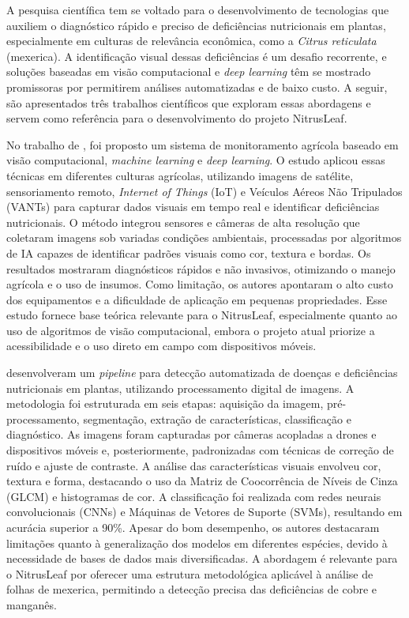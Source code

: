A pesquisa científica tem se voltado para o desenvolvimento de tecnologias que auxiliem o diagnóstico rápido e preciso de deficiências nutricionais em plantas, especialmente em culturas de relevância econômica, como a \textit{Citrus reticulata} (mexerica). A identificação visual dessas deficiências é um desafio recorrente, e soluções baseadas em visão computacional e \textit{deep learning} têm se mostrado promissoras por permitirem análises automatizadas e de baixo custo. A seguir, são apresentados três trabalhos científicos que exploram essas abordagens e servem como referência para o desenvolvimento do projeto NitrusLeaf.

No trabalho de \textcite{Muthusamy2023}, foi proposto um sistema de monitoramento agrícola baseado em visão computacional, \textit{machine learning} e \textit{deep learning}. O estudo aplicou essas técnicas em diferentes culturas agrícolas, utilizando imagens de satélite, sensoriamento remoto, \textit{Internet of Things} (IoT) e Veículos Aéreos Não Tripulados (VANTs) para capturar dados visuais em tempo real e identificar deficiências nutricionais. O método integrou sensores e câmeras de alta resolução que coletaram imagens sob variadas condições ambientais, processadas por algoritmos de IA capazes de identificar padrões visuais como cor, textura e bordas. Os resultados mostraram diagnósticos rápidos e não invasivos, otimizando o manejo agrícola e o uso de insumos. Como limitação, os autores apontaram o alto custo dos equipamentos e a dificuldade de aplicação em pequenas propriedades. Esse estudo fornece base teórica relevante para o NitrusLeaf, especialmente quanto ao uso de algoritmos de visão computacional, embora o projeto atual priorize a acessibilidade e o uso direto em campo com dispositivos móveis.

\textcite{Ghorai2021} desenvolveram um \textit{pipeline} para detecção automatizada de doenças e deficiências nutricionais em plantas, utilizando processamento digital de imagens. A metodologia foi estruturada em seis etapas: aquisição da imagem, pré-processamento, segmentação, extração de características, classificação e diagnóstico. As imagens foram capturadas por câmeras acopladas a drones e dispositivos móveis e, posteriormente, padronizadas com técnicas de correção de ruído e ajuste de contraste. A análise das características visuais envolveu cor, textura e forma, destacando o uso da Matriz de Coocorrência de Níveis de Cinza (GLCM) e histogramas de cor. A classificação foi realizada com redes neurais convolucionais (CNNs) e Máquinas de Vetores de Suporte (SVMs), resultando em acurácia superior a 90\%. Apesar do bom desempenho, os autores destacaram limitações quanto à generalização dos modelos em diferentes espécies, devido à necessidade de bases de dados mais diversificadas. A abordagem é relevante para o NitrusLeaf por oferecer uma estrutura metodológica aplicável à análise de folhas de mexerica, permitindo a detecção precisa das deficiências de cobre e manganês.

